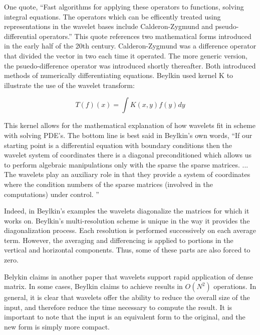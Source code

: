 One quote, ``Fast algorithms for applying these operators to functions, solving integral equations.  The operators which can be efficently treated using representations in the wavelet bases include Calderon-Zygmund and pseudo-differential operators.''\cite{bvpbeylkin}  This quote references two mathematical forms introduced in the early half of the 20th century.  Calderon-Zygmund was a difference operator that divided the vector in two each time it operated.  The more generic version, the psuedo-difference operator was introduced shortly thereafter.  Both introduced methods of numerically differentiating equations.  Beylkin used kernel K to illustrate the use of the wavelet transform: 

\[T(f)(x) = \int K(x,y) f(y)dy \]

This kernel allows for the mathematical explanation of how wavelets fit in scheme with %
solving PDE's.  The bottom line is best said in Beylkin's own words, ``If our starting point is a differential equation with boundary conditions then the wavelet system of coordinates there is a diagonal preconditioned which allows us to perform algebraic manipulations only with the sparse the sparse matrices. ... The wavelets play an auxiliary role in that they provide a system of coordinates where the condition numbers of the sparse matrices (involved in the computations) under control.  ''

Indeed, in Beylkin's examples the wavelets diagonalize the matrices for which it works on.  Beylkin's multi-resolution scheme is unique in the way it provides the diagonalization process.  %
Each resolution is performed successively on each average term.  However, the averaging and differencing is applied to portions in the vertical and horizontal components.  Thus, some of these parts are also forced to zero. %


Belykin claims in another paper that wavelets support rapid application of dense matrix.  In some cases, Beylkin claims to achieve results %
 in $O(N^2)$ operations.  In general, it is clear that wavelets offer the ability to reduce the overall size of the input, and therefore reduce the time necessary to compute the result.  It is important to note that the input is an equivalent form to the original, and the new form is simply more compact.  

